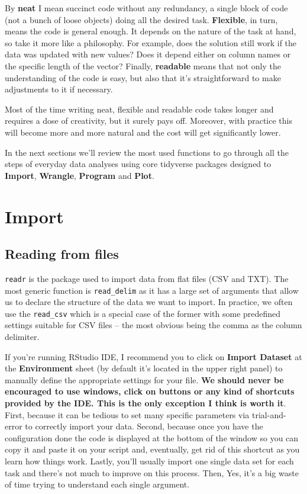 \documentclass[
]{book}
\begin{document}
By \textbf{neat} I mean succinct code without any redundancy, a single block of code (not a bunch of loose objects) doing all the desired task. \textbf{Flexible}, in turn, means the code is general enough. It depends on the nature of the task at hand, so take it more like a philosophy. For example, does the solution still work if the data was updated with new values? Does it depend either on column names or the specific length of the vector? Finally, \textbf{readable} means that not only the understanding of the code is easy, but also that it's straightforward to make adjustments to it if necessary.

Most of the time writing neat, flexible and readable code takes longer and requires a dose of creativity, but it surely pays off. Moreover, with practice this will become more and more natural and the cost will get significantly lower.

In the next sections we'll review the most used functions to go through all the steps of everyday data analyses using core tidyverse packages designed to \textbf{Import}, \textbf{Wrangle}, \textbf{Program} and \textbf{Plot}.

\hypertarget{import}{%
\section{Import}\label{import}}

\hypertarget{reading-from-files}{%
\subsection{Reading from files}\label{reading-from-files}}

\texttt{readr} is the package used to import data from flat files (CSV and TXT). The most generic function is \texttt{read\_delim} as it has a large set of arguments that allow us to declare the structure of the data we want to import. In practice, we often use the \texttt{read\_csv} which is a special case of the former with some predefined settings suitable for CSV files -- the most obvious being the comma as the column delimiter.

If you're running RStudio IDE, I recommend you to click on \textbf{Import Dataset} at the \textbf{Environment} sheet (by default it's located in the upper right panel) to manually define the appropriate settings for your file. \textbf{We should never be encouraged to use windows, click on buttons or any kind of shortcuts provided by the IDE. This is the only exception I think is worth it}. First, because it can be tedious to set many specific parameters via trial-and-error to correctly import your data. Second, because once you have the configuration done the code is displayed at the bottom of the window so you can copy it and paste it on your script and, eventually, get rid of this shortcut as you learn how things work. Lastly, you'll usually import one single data set for each task and there's not much to improve on this process. Then, Yes, it's a big waste of time trying to understand each single argument.
\end{document}
